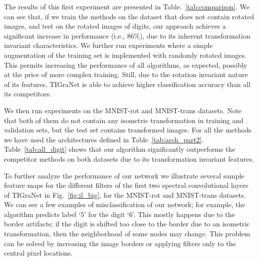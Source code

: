 \documentclass[10pt,journal,compsoc]{IEEEtran}
\begin{document}
	The results of this first experiment are presented in Table.~\ref{tab:comparison}. We can see that, if we train the methods on the dataset that does not contain rotated images, and test on the rotated images of digits, our approach achieves a significant increase in performance (i.e., $86\%$), due to its inherent transformation invariant characteristics. We further run experiments where a simple augmentation of the training set is implemented with randomly rotated images. This permits increasing the performance of all algorithms, as expected, possibly at the price of more complex training. Still, due to the rotation invariant nature of its features, TIGraNet is able to achieve higher classification accuracy than all its competitors. 
	
	We then run experiments on the MNIST-rot and MNIST-trans datasets. Note that both of them do not contain any isometric transformation in training and validation sets, but the test set contains transformed images. For all the methods we have used the architectures defined in Table~\ref{tab:arch_part2}. Table~\ref{tab:all_digit} shows that our algorithm significantly outperforms the competitor methods on both datasets due to its transformation invariant features.
	
	To further analyze the performance of our network we illustrate several sample feature maps for the different filters of the first two spectral convolutional layers of TIGraNet in Fig.~\ref{fig:il_big}, for the MNIST-rot and MNIST-trans datasets. We can see a few examples of misclassification of our network; for example, the algorithm predicts label `5' for the digit `6'. This mostly happens due to the border artifacts; if the digit is shifted too close to the border due to an isometric transformation, then the neighborhood of some nodes may change. 
	This problem can be solved by increasing the image borders or applying filters only to the central pixel locations. 
	
\end{document}
